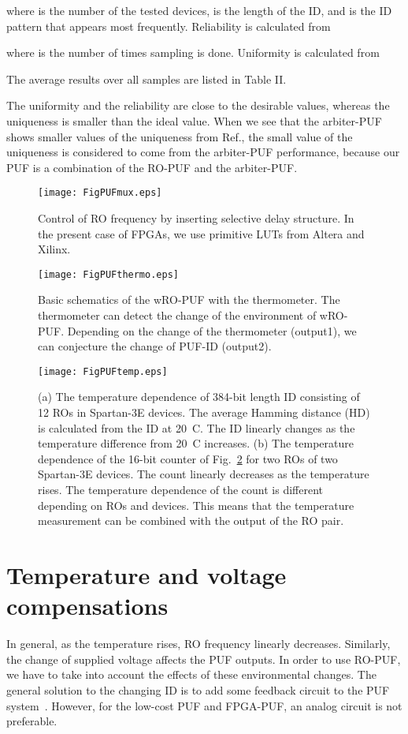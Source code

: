 ﻿\documentclass[aps,preprint,prb,superscriptaddress,amsmath,showpacs,tightenlines]{revtex4}
\begin{document}
where  is the number of the tested devices,  is  
the length of the ID, and  is the ID pattern that appears most frequently.
Reliability is calculated from

where  is the number of times sampling is done.
Uniformity is calculated from 

The average results over all samples are listed in Table II.

The uniformity and the reliability are close to the desirable values, 
whereas the uniqueness is smaller than the ideal value.
When we see that the arbiter-PUF shows smaller values of the uniqueness 
from Ref.\cite{Maiti3,Hori}, 
the small value of the uniqueness is considered to
come from the arbiter-PUF performance, 
because our PUF is a combination of the RO-PUF and the arbiter-PUF.



\begin{figure}
\centering
\texttt{[image: FigPUFmux.eps]}
\caption{
Control of RO frequency by inserting selective 
delay structure. In the present case of FPGAs,
we use primitive LUTs from Altera and Xilinx.
} 
\label{mux}
\end{figure}

\begin{figure}
\centering
\texttt{[image: FigPUFthermo.eps]}
\caption{
Basic schematics of the wRO-PUF with the thermometer.
The thermometer can detect the change of the environment of wRO-PUF.
Depending on the change of the thermometer (output1), 
we can conjecture the change of PUF-ID (output2).} 
\label{system}
\end{figure}

\begin{figure}
\centering
\texttt{[image: FigPUFtemp.eps]}
\caption{
(a) The temperature dependence of 384-bit length 
ID consisting of 12 ROs in Spartan-3E devices.
The average Hamming distance (HD) is calculated 
from the ID at 20~C.
The ID linearly changes as the temperature difference 
from 20~C increases. 
(b)
The temperature dependence of the 16-bit counter 
of Fig.~\ref{system} for two ROs of two Spartan-3E devices.
The count linearly decreases as the temperature rises.
The temperature dependence of the count is different 
depending on ROs and devices. This means that the 
temperature measurement can be combined with the 
output of the RO pair.
} 
\label{temperature}
\end{figure}



\section{Temperature and voltage compensations}
In general, as the temperature rises, RO frequency linearly decreases.
Similarly, the change of supplied voltage affects the PUF outputs.
In order to use RO-PUF, we have to take into account 
the effects of these environmental changes. 
The general solution to the changing ID is to add some feedback 
circuit to the PUF system~\cite{Yang}. 
However, for the low-cost PUF and FPGA-PUF,
an analog circuit is not preferable. 
\end{document}
